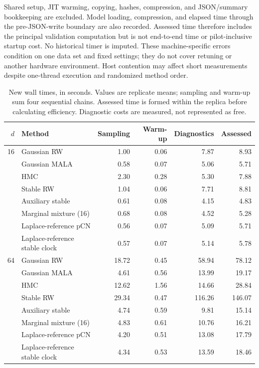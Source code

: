 \documentclass[11pt]{article}
\theoremstyle{definition}\newtheorem{definition}[theorem]{Definition}
\theoremstyle{remark}\newtheorem{remark}[theorem]{Remark}
\numberwithin{equation}{section}
\newcommand{\1}{\mathbf 1}
\begin{document}
Shared setup, JIT warming, copying, hashes, compression, and JSON/summary bookkeeping are excluded. Model loading, compression, and elapsed time through the pre-JSON-write boundary are also recorded. Assessed time therefore includes the principal validation computation but is not end-to-end time or pilot-inclusive startup cost. No historical timer is imputed. These machine-specific errors condition on one data set and fixed settings; they do not cover retuning or another hardware environment. Host contention may affect short measurements despite one-thread execution and randomized method order.
\begin{table}[tb]\centering\footnotesize\setlength{\tabcolsep}{4pt}
\caption{New wall times, in seconds. Values are replicate means; sampling and warm-up sum four sequential chains. Assessed time is formed within the replica before calculating efficiency. Diagnostic costs are measured, not represented as free.}\label{tab:currentcost}
\begin{tabular}{rlrrrr}\toprule $d$&Method&Sampling&Warm-up&Diagnostics&Assessed\\\midrule
16&Gaussian RW&1.00&0.06&7.87&8.93\\
&Gaussian MALA&0.58&0.07&5.06&5.71\\
&HMC&2.30&0.28&5.30&7.88\\
&Stable RW&1.04&0.06&7.71&8.81\\
&Auxiliary stable&0.61&0.08&4.15&4.83\\
&Marginal mixture (16)&0.68&0.08&4.52&5.28\\
&Laplace-reference pCN&0.56&0.07&5.09&5.71\\
&Laplace-reference stable clock&0.57&0.07&5.14&5.78\\
\midrule
64&Gaussian RW&18.72&0.45&58.94&78.12\\
&Gaussian MALA&4.61&0.56&13.99&19.17\\
&HMC&12.62&1.56&14.66&28.84\\
&Stable RW&29.34&0.47&116.26&146.07\\
&Auxiliary stable&4.74&0.59&9.81&15.14\\
&Marginal mixture (16)&4.83&0.61&10.76&16.21\\
&Laplace-reference pCN&4.20&0.51&13.08&17.79\\
&Laplace-reference stable clock&4.34&0.53&13.59&18.46\\
\bottomrule\end{tabular}\end{table}
\end{document}
